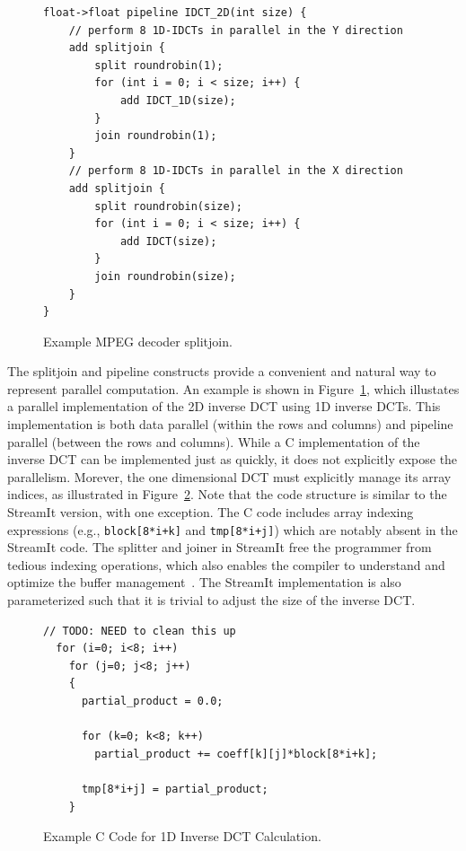 \begin{figure}[t]
  \begin{scriptsize}
    \begin{verbatim}
float->float pipeline IDCT_2D(int size) {
    // perform 8 1D-IDCTs in parallel in the Y direction
    add splitjoin {
        split roundrobin(1);
        for (int i = 0; i < size; i++) {
            add IDCT_1D(size);
        }
        join roundrobin(1);
    }
    // perform 8 1D-IDCTs in parallel in the X direction
    add splitjoin {
        split roundrobin(size);
        for (int i = 0; i < size; i++) {
            add IDCT(size);
        }
        join roundrobin(size);
    }
}
  \end{verbatim}
  \end{scriptsize}
  \vspace{-12pt}
  \caption{Example MPEG decoder splitjoin.}
  \label{fig:decoder-sj}
\end{figure}

The splitjoin and pipeline constructs provide a convenient and natural
way to represent parallel computation. An example is shown in
Figure~\ref{fig:decoder-sj}, which illustates a parallel
implementation of the 2D inverse DCT using 1D inverse DCTs. This
implementation is both data parallel (within the rows and columns) and
pipeline parallel (between the rows and columns). While a C
implementation of the inverse DCT can be implemented just as quickly,
it does not explicitly expose the parallelism. Morever, the one
dimensional DCT must explicitly manage its array indices, as
illustrated in Figure~\ref{fig:idct_creference}. Note that the code
structure is similar to the StreamIt version, with one exception. The
C code includes array indexing expressions (e.g.,
\texttt{block[8*i+k]} and \texttt{tmp[8*i+j]}) which are notably
absent in the StreamIt code. The splitter and joiner in StreamIt free
the programmer from tedious indexing operations, which also enables
the compiler to understand and optimize the buffer
management~\cite{sermulins05lctes}.  The StreamIt implementation is
also parameterized such that it is trivial to adjust the size of the
inverse DCT.

\begin{figure}[t]
  \begin{scriptsize}
    \begin{verbatim}
// TODO: NEED to clean this up
  for (i=0; i<8; i++)
    for (j=0; j<8; j++)
    {
      partial_product = 0.0;

      for (k=0; k<8; k++)
        partial_product += coeff[k][j]*block[8*i+k];

      tmp[8*i+j] = partial_product;
    }
    \end{verbatim}
  \end{scriptsize}
  \vspace{-12pt}
  \caption{Example C Code for 1D Inverse DCT Calculation.}
  \label{fig:idct_creference}
\end{figure}

